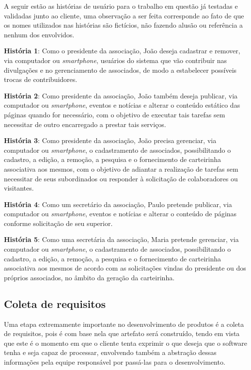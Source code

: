 A seguir estão as histórias de usuário para o trabalho em questão já testadas e validadas junto ao cliente, uma observação a ser feita corresponde ao fato de que os nomes utilizados nas histórias são fictícios, não fazendo alusão ou referência a nenhum dos envolvidos.

\textbf{História 1}: Como o presidente da associação, João deseja cadastrar e remover, via computador ou \textit{smartphone}, usuários do sistema que vão contribuir nas divulgações e no gerenciamento de associados, de modo a estabelecer possíveis trocas de contribuidores.

\textbf{História 2}: Como presidente da associação, João também deseja publicar, via computador ou \textit{smartphone}, eventos e notícias e alterar o conteúdo estático das páginas quando for necessário, com o objetivo de executar tais tarefas sem necessitar de outro encarregado a prestar tais serviços.

\textbf{História 3}: Como presidente da associação, João precisa gerenciar, via computador ou \textit{smartphone}, o cadastramento de associados, possibilitando o cadastro, a edição, a remoção, a pesquisa e o fornecimento de carteirinha associativa aos mesmos, com o objetivo de adiantar a realização de tarefas sem necessitar de seus subordinados ou responder à solicitação de colaboradores ou visitantes.

\textbf{História 4}: Como um secretário da associação, Paulo pretende publicar, via computador ou \textit{smartphone}, eventos e notícias e alterar o conteúdo de páginas conforme solicitação de seu superior. 

\textbf{História 5}: Como uma secretária da associação, Maria pretende gerenciar, via computador ou \textit{smartphone}, o cadastramento de associados, possibilitando o cadastro, a edição, a remoção, a pesquisa e o fornecimento de carteirinha associativa aos mesmos de acordo com as solicitações vindas do presidente ou dos próprios associados, no âmbito da geração da carteirinha.

\hspace{2.5cm}
\subsection{Coleta de requisitos}
\label{subsec:requisitos}
\hspace{2.5cm}

Uma etapa extremamente importante no desenvolvimento de produtos é a coleta de requisitos, pois é com base nela que artefato será construído, tendo em vista que este é o momento em que o cliente tenta exprimir o que deseja que o software tenha e seja capaz de processar, envolvendo também a abstração dessas informações pela equipe responsável por passá-las para o desenvolvimento. 

